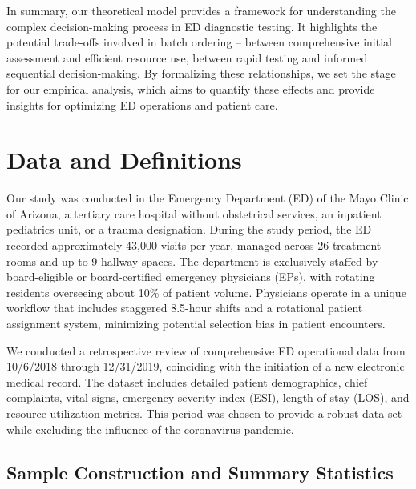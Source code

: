 \documentclass[,,nonblindrev]{informs}
\begin{document}
In summary, our theoretical model provides a framework for understanding
the complex decision-making process in ED diagnostic testing. It
highlights the potential trade-offs involved in batch ordering --
between comprehensive initial assessment and efficient resource use,
between rapid testing and informed sequential decision-making. By
formalizing these relationships, we set the stage for our empirical
analysis, which aims to quantify these effects and provide insights for
optimizing ED operations and patient care.

\hypertarget{sec:II}{%
\section{Data and Definitions}\label{sec:II}}

Our study was conducted in the Emergency Department (ED) of the Mayo
Clinic of Arizona, a tertiary care hospital without obstetrical
services, an inpatient pediatrics unit, or a trauma designation. During
the study period, the ED recorded approximately 43,000 visits per year,
managed across 26 treatment rooms and up to 9 hallway spaces. The
department is exclusively staffed by board-eligible or board-certified
emergency physicians (EPs), with rotating residents overseeing about
10\% of patient volume. Physicians operate in a unique workflow that
includes staggered 8.5-hour shifts and a rotational patient assignment
system, minimizing potential selection bias in patient encounters.

We conducted a retrospective review of comprehensive ED operational data
from 10/6/2018 through 12/31/2019, coinciding with the initiation of a
new electronic medical record. The dataset includes detailed patient
demographics, chief complaints, vital signs, emergency severity index
(ESI), length of stay (LOS), and resource utilization metrics. This
period was chosen to provide a robust data set while excluding the
influence of the coronavirus pandemic.

\hypertarget{sample-construction-and-summary-statistics}{%
\subsection{Sample Construction and Summary
Statistics}\label{sample-construction-and-summary-statistics}}
\end{document}
